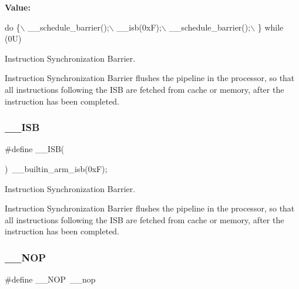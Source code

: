 {\bfseries Value\+:}
\begin{DoxyCode}
\textcolor{keywordflow}{do} \{\(\backslash\)
                   \_\_schedule\_barrier();\(\backslash\)
                   \_\_isb(0xF);\(\backslash\)
                   \_\_schedule\_barrier();\(\backslash\)
                \} \textcolor{keywordflow}{while} (0U)
\end{DoxyCode}


Instruction Synchronization Barrier. 

Instruction Synchronization Barrier flushes the pipeline in the processor, so that all instructions following the I\+SB are fetched from cache or memory, after the instruction has been completed. \mbox{\label{group___c_m_s_i_s___core___instruction_interface_gaad233022e850a009fc6f7602be1182f6}} 
\subsubsection{\texorpdfstring{\+\_\+\+\_\+\+I\+SB}{\_\_ISB}\hspace{0.1cm}{\footnotesize\ttfamily [2/2]}}
{\footnotesize\ttfamily \#define \+\_\+\+\_\+\+I\+SB(\begin{DoxyParamCaption}{ }\end{DoxyParamCaption})~\+\_\+\+\_\+builtin\+\_\+arm\+\_\+isb(0x\+F);}



Instruction Synchronization Barrier. 

Instruction Synchronization Barrier flushes the pipeline in the processor, so that all instructions following the I\+SB are fetched from cache or memory, after the instruction has been completed. \mbox{\label{group___c_m_s_i_s___core___instruction_interface_gabd585ddc865fb9b7f2493af1eee1a572}} 
\subsubsection{\texorpdfstring{\+\_\+\+\_\+\+N\+OP}{\_\_NOP}\hspace{0.1cm}{\footnotesize\ttfamily [1/2]}}
{\footnotesize\ttfamily \#define \+\_\+\+\_\+\+N\+OP~\+\_\+\+\_\+nop}



